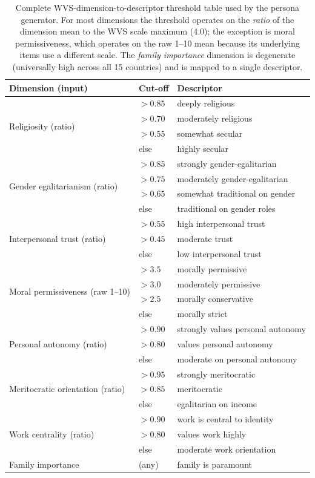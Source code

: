 \documentclass{article}
\begin{document}
\begin{table}[h]\centering\small
\caption{Complete WVS-dimension-to-descriptor threshold table used by the
persona generator. For most dimensions the threshold operates on the
\emph{ratio} of the dimension mean to the WVS scale maximum (4.0); the
exception is moral permissiveness, which operates on the raw 1--10 mean
because its underlying items use a different scale. The \emph{family
importance} dimension is degenerate (universally high across all 15
countries) and is mapped to a single descriptor.}
\label{tab:wvs_thresholds}
\setlength{\tabcolsep}{4pt}
\begin{tabular}{lll}\toprule
Dimension (input) & Cut-off & Descriptor \\\midrule
\multirow{4}{*}{Religiosity (ratio)}
 & $>0.85$ & deeply religious \\
 & $>0.70$ & moderately religious \\
 & $>0.55$ & somewhat secular \\
 & else    & highly secular \\\midrule
\multirow{4}{*}{Gender egalitarianism (ratio)}
 & $>0.85$ & strongly gender-egalitarian \\
 & $>0.75$ & moderately gender-egalitarian \\
 & $>0.65$ & somewhat traditional on gender \\
 & else    & traditional on gender roles \\\midrule
\multirow{3}{*}{Interpersonal trust (ratio)}
 & $>0.55$ & high interpersonal trust \\
 & $>0.45$ & moderate trust \\
 & else    & low interpersonal trust \\\midrule
\multirow{4}{*}{Moral permissiveness (raw 1--10)}
 & $>3.5$  & morally permissive \\
 & $>3.0$  & moderately permissive \\
 & $>2.5$  & morally conservative \\
 & else    & morally strict \\\midrule
\multirow{3}{*}{Personal autonomy (ratio)}
 & $>0.90$ & strongly values personal autonomy \\
 & $>0.80$ & values personal autonomy \\
 & else    & moderate on personal autonomy \\\midrule
\multirow{3}{*}{Meritocratic orientation (ratio)}
 & $>0.95$ & strongly meritocratic \\
 & $>0.85$ & meritocratic \\
 & else    & egalitarian on income \\\midrule
\multirow{3}{*}{Work centrality (ratio)}
 & $>0.90$ & work is central to identity \\
 & $>0.80$ & values work highly \\
 & else    & moderate work orientation \\\midrule
Family importance & (any)   & family is paramount \\\bottomrule
\end{tabular}
\end{table}
\end{document}
